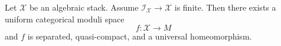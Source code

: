 %

\begin{theorem}
\label{theorem-keel-mori}
Let $\mathcal{X}$ be an algebraic stack. Assume
$\mathcal{I}_\mathcal{X} \to \mathcal{X}$ is finite.
Then there exists a uniform categorical moduli space
$$
f : \mathcal{X} \longrightarrow M
$$
and $f$ is separated, quasi-compact, and a universal homeomorphism.
\end{theorem}

